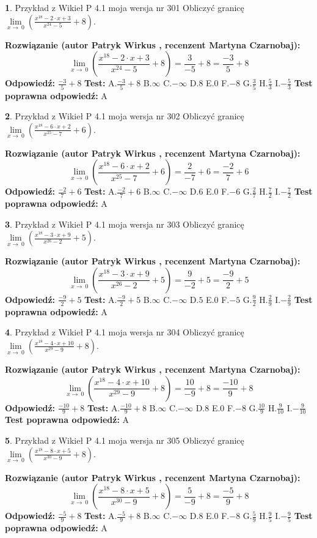 \documentclass[12pt, a4paper]{article}
\theoremstyle{definition} %
\newtheorem{zad}{}
\newcommand{\zadStart}[1]{\begin{zad}#1\newline}
\newcommand{\zadStop}{\end{zad}}
\newcommand{\rozwStart}[2]{\noindent \textbf{Rozwiązanie (autor #1 , recenzent #2): }\newline}
\newcommand{\rozwStop}{\newline}
\newcommand{\odpStart}{\noindent \textbf{Odpowiedź:}\newline}
\newcommand{\odpStop}{\newline}
\newcommand{\testStart}{\noindent \textbf{Test:}\newline}
\newcommand{\testStop}{\newline}
\newcommand{\kluczStart}{\noindent \textbf{Test poprawna odpowiedź:}\newline}
\newcommand{\kluczStop}{\newline}
\begin{document}
\zadStart{Przykład z Wikieł P 4.1 moja wersja nr 301}
Obliczyć granicę $\lim\limits_{x\to\ 0}(\frac{x^{18}-2 \cdot x +3}{x^{24}-5}+8)$.
\zadStop
\rozwStart{Patryk Wirkus}{Martyna Czarnobaj}
$$\lim\limits_{x\to\ 0}(\frac{x^{18}-2 \cdot x +3}{x^{24}-5}+8)=\frac{3}{-5}+8=\frac{-3}{5}+8$$
\rozwStop
\odpStart
$\frac{-3}{5}+8$
\odpStop
\testStart
A.$\frac{-3}{5}+8$
B.$\infty$
C.$-\infty$
D.$8$
E.$0$
F.$-8$
G.$\frac{3}{5}$
H.$\frac{5}{3}$
I.$-\frac{5}{3}$
\testStop
\kluczStart
A
\kluczStop



\zadStart{Przykład z Wikieł P 4.1 moja wersja nr 302}
Obliczyć granicę $\lim\limits_{x\to\ 0}(\frac{x^{18}-6 \cdot x +2}{x^{25}-7}+6)$.
\zadStop
\rozwStart{Patryk Wirkus}{Martyna Czarnobaj}
$$\lim\limits_{x\to\ 0}(\frac{x^{18}-6 \cdot x +2}{x^{25}-7}+6)=\frac{2}{-7}+6=\frac{-2}{7}+6$$
\rozwStop
\odpStart
$\frac{-2}{7}+6$
\odpStop
\testStart
A.$\frac{-2}{7}+6$
B.$\infty$
C.$-\infty$
D.$6$
E.$0$
F.$-6$
G.$\frac{2}{7}$
H.$\frac{7}{2}$
I.$-\frac{7}{2}$
\testStop
\kluczStart
A
\kluczStop



\zadStart{Przykład z Wikieł P 4.1 moja wersja nr 303}
Obliczyć granicę $\lim\limits_{x\to\ 0}(\frac{x^{18}-3 \cdot x +9}{x^{26}-2}+5)$.
\zadStop
\rozwStart{Patryk Wirkus}{Martyna Czarnobaj}
$$\lim\limits_{x\to\ 0}(\frac{x^{18}-3 \cdot x +9}{x^{26}-2}+5)=\frac{9}{-2}+5=\frac{-9}{2}+5$$
\rozwStop
\odpStart
$\frac{-9}{2}+5$
\odpStop
\testStart
A.$\frac{-9}{2}+5$
B.$\infty$
C.$-\infty$
D.$5$
E.$0$
F.$-5$
G.$\frac{9}{2}$
H.$\frac{2}{9}$
I.$-\frac{2}{9}$
\testStop
\kluczStart
A
\kluczStop



\zadStart{Przykład z Wikieł P 4.1 moja wersja nr 304}
Obliczyć granicę $\lim\limits_{x\to\ 0}(\frac{x^{18}-4 \cdot x +10}{x^{29}-9}+8)$.
\zadStop
\rozwStart{Patryk Wirkus}{Martyna Czarnobaj}
$$\lim\limits_{x\to\ 0}(\frac{x^{18}-4 \cdot x +10}{x^{29}-9}+8)=\frac{10}{-9}+8=\frac{-10}{9}+8$$
\rozwStop
\odpStart
$\frac{-10}{9}+8$
\odpStop
\testStart
A.$\frac{-10}{9}+8$
B.$\infty$
C.$-\infty$
D.$8$
E.$0$
F.$-8$
G.$\frac{10}{9}$
H.$\frac{9}{10}$
I.$-\frac{9}{10}$
\testStop
\kluczStart
A
\kluczStop



\zadStart{Przykład z Wikieł P 4.1 moja wersja nr 305}
Obliczyć granicę $\lim\limits_{x\to\ 0}(\frac{x^{18}-8 \cdot x +5}{x^{30}-9}+8)$.
\zadStop
\rozwStart{Patryk Wirkus}{Martyna Czarnobaj}
$$\lim\limits_{x\to\ 0}(\frac{x^{18}-8 \cdot x +5}{x^{30}-9}+8)=\frac{5}{-9}+8=\frac{-5}{9}+8$$
\rozwStop
\odpStart
$\frac{-5}{9}+8$
\odpStop
\testStart
A.$\frac{-5}{9}+8$
B.$\infty$
C.$-\infty$
D.$8$
E.$0$
F.$-8$
G.$\frac{5}{9}$
H.$\frac{9}{5}$
I.$-\frac{9}{5}$
\testStop
\kluczStart
A
\kluczStop
\end{document}
